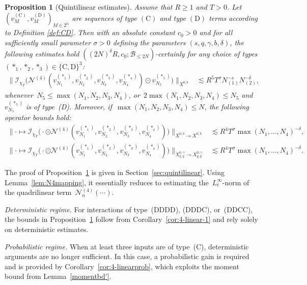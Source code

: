 \documentclass[11pt,reqno,english]{amsart}
\numberwithin{equation}{section}
\theoremstyle{plain}
\newtheorem{proposition}[theorem]{Proposition}
\theoremstyle{definition}
\theoremstyle{remark}
\newcommand{\N}{\mathbb{N}}
\newcommand{\dotcirc}{\mathbin{\odot}}
\begin{document}
\begin{proposition}[Quintilinear estimates]
	\label{prop:quintilinear}
 Assume that $R\geq 1$ and $T>0$. Let $(v_M^{(\mathrm{C})}, v_M^{(\mathrm{D})})_{M\in 2^{\N}}$ are sequences of type $(\mathrm{C})$ and type $(\mathrm{D})$ terms according to Definition \ref{def:CD}.
Then with an absolute constant $c_0>0$ and for all sufficiently small parameter $\sigma>0$ defining the parameters $(s,q,\gamma,b,\delta)$, the following estimates hold
$((2N)^{\delta}R,c_0;\mathcal{B}_{\leq2N})$-certainly for any choice of types~$(\ast_1,\ast_2,\ast_3)\in\{\mathrm{C},\mathrm{D}\}^3$:
	\begin{align*}
		\big\|\mathcal{I}_{\chi_T}\big(
		\mathcal{N}^{(4)}(v_{N_1}^{(\ast_1)},v_{N_2}^{(\ast_2)},v_{N_3}^{(\ast_3)},v_{N_4}^{(\ast_4)})
		\dotcirc v_{N_5}^{(\ast_5)}
		\big)\big\|_{X^{0,b}}
		&\lesssim R^5T^{\sigma}N_{(1)}^{-s}N_{(2)}^{-\delta},
	\end{align*}
	whenever~$N_5\leq \max(N_1,N_2,N_3,N_4)$, or~$2\max(N_1,N_2,N_3,N_4)\leq N_5$ and~$v_{N_5}^{(\ast_5)}$ is of type~(D).
	Moreover, if~$\max(N_1,N_2,N_3,N_4)\leq N$, the following operator bounds hold:
	\begin{align*}
		\big\|\cdot\mapsto
		\mathcal{I}_{\chi_T}\big(
		\cdot\dotcirc\mathcal{N}^{(4)}(v_{N_1}^{(\ast_1)},v_{N_2}^{(\ast_2)},v_{N_3}^{(\ast_3)},v_{N_4}^{(\ast_4)})
		\big)\big\|_{X^{0,b}\to X^{0,b}}
		&\lesssim R^4T^{\sigma}\max(N_1,\dots,N_4)^{-\delta},\\
		\big\|\cdot\mapsto
		\mathcal{I}_{\chi_T}\big(
		\cdot\dotcirc\mathcal{N}^{(4)}(v_{N_1}^{(\ast_1)},v_{N_2}^{(\ast_2)},v_{N_3}^{(\ast_3)},v_{N_4}^{(\ast_4)})
		\big)\big\|_{X_{q,q}^{0,\gamma}\to X_{q,q}^{0,\gamma}}
		&\lesssim R^4T^{\sigma}\max(N_1,\dots,N_4)^{-\delta}.
	\end{align*}
\end{proposition}
The proof of Proposition~\ref{prop:quintilinear} is given in Section~\ref{sec:quintilinear}.
Using Lemma~\ref{lem:N4mapping}, it essentially reduces to estimating the~$L_t^{\infty}$-norm of the quadrilinear term~$\mathcal{N}_n^{(4)}(\cdots)$.

\emph{Deterministic regime.}
For interactions of type~(DDDD), (DDDC), or~(DDCC), the bounds in
Proposition~\ref{prop:quintilinear} follow from Corollary~\ref{cor:4-linear-1}
and rely solely on deterministic estimates.

\emph{Probabilistic regime.}
When at least three inputs are of type~(C), deterministic arguments are no longer sufficient.
In this case, a probabilistic gain is required and is provided by
Corollary~\ref{cor:4-linearprob}, which exploits the moment bound
from Lemma~\ref{momentbd'}.
\end{document}
